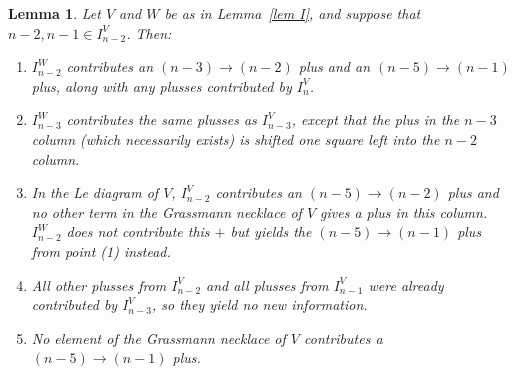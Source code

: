 \documentclass[11pt]{article}
\newtheorem{lem}[thm]{Lemma}
\theoremstyle{remark}
\theoremstyle{definition}
\begin{document}
%
%
%

\begin{lem}\label{lem n-2 bad}
Let $V$ and $W$ be as in Lemma~\ref{lem I}, and suppose that $n-2,n-1 \in I_{n-2}^{V}$. Then:
  \begin{enumerate}
  \item $I_{n-2}^W$ contributes an $(n-3)\rightarrow (n-2)$ plus and an $(n-5)\rightarrow (n-1)$ plus, along with any plusses contributed by $I_n^V$.
  \item $I_{n-3}^W$ contributes the same plusses as $I_{n-3}^V$, except that the plus in the $n-3$ column (which necessarily exists) is shifted one square left into the $n-2$ column.
  \item In the Le diagram of $V$, $I_{n-2}^{V}$ contributes an $(n-5)\rightarrow (n-2)$ plus and no other term in the Grassmann necklace of $V$ gives a plus in this column.  $I_{n-2}^W$ does not contribute this $+$ but yields the $(n-5)\rightarrow (n-1)$ plus from point (1) instead.
  \item All other plusses from $I_{n-2}^{V}$ and all plusses from $I_{n-1}^V$ were already contributed by $I_{n-3}^V$, so they yield no new information.
  \item No element of the Grassmann necklace of $V$ contributes a $(n-5)\rightarrow (n-1)$ plus.
  \end{enumerate} 
\end{lem}
\end{document}
